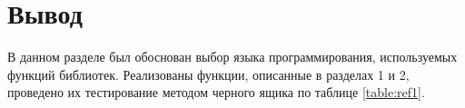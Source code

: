 \section*{Вывод}
В данном разделе был обоснован выбор языка программирования, используемых функций библиотек. Реализованы функции, описанные в разделах 1 и 2, проведено их тестирование методом черного ящика по таблице \ref{table:ref1}. 